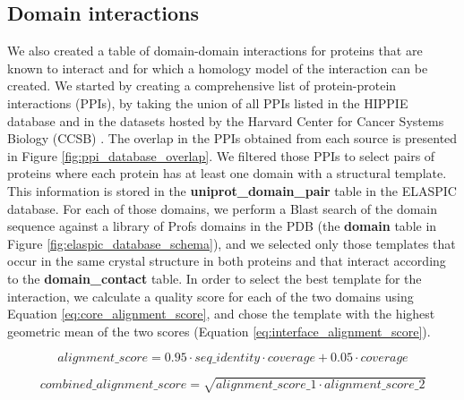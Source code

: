\subsection{Domain interactions}

We also created a table of domain-domain interactions for proteins that are known to interact and for which a homology model of the interaction can be created. We started by creating a comprehensive list of protein-protein interactions (PPIs), by taking the union of all PPIs listed in the HIPPIE database \cite{schaefer_hippie:_2012} and in the datasets hosted by the Harvard Center for Cancer Systems Biology (CCSB) \cite{rolland_proteome-scale_2014}. The overlap in the PPIs obtained from each source is presented in Figure \ref{fig:ppi_database_overlap}. We filtered those PPIs to select pairs of proteins where each protein has at least one domain with a structural template. This information is stored in the \textbf{uniprot\_domain\_pair} table in the ELASPIC database. For each of those domains, we perform a Blast search of the domain sequence against a library of Profs domains in the PDB (the \textbf{domain} table in Figure \ref{fig:elaspic_database_schema}), and we selected only those templates that occur in the same crystal structure in both proteins and that interact according to the \textbf{domain\_contact} table. In order to select the best template for the interaction, we calculate a quality score for each of the two domains using Equation \ref{eq:core_alignment_score}, and chose the template with the highest geometric mean of the two scores (Equation \ref{eq:interface_alignment_score}).

\begin{equation} \label{eq:core_alignment_score}
	alignment\_score = 0.95 \cdot seq\_identity \cdot coverage + 0.05 \cdot coverage
\end{equation}

\begin{equation} \label{eq:interface_alignment_score}
	combined\_alignment\_score = \sqrt{alignment\_score\_1 \cdot alignment\_score\_2}
\end{equation}


